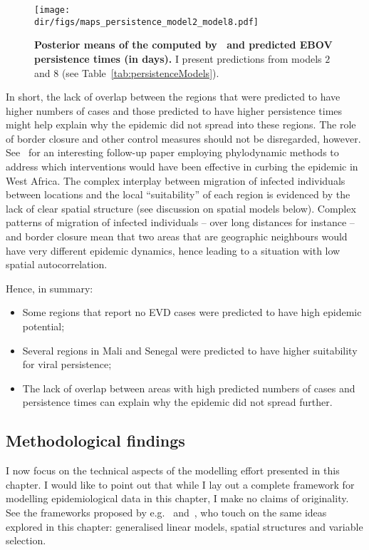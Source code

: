 \begin{figure}[htbp]
  \centering
  \texttt{[image: \\dir/figs/maps\_persistence\_model2\_model8.pdf]}
  \caption[Persistence times predictions]{\textbf{Posterior means of the computed by~\cite{Dudas2017} and predicted EBOV persistence times (in days).}
  I present predictions from models $2$ and $8$ (see Table~\ref{tab:persistenceModels}).
  }
  \label{fig:mapsPersistence}
\end{figure}


In short, the lack of overlap between the regions that were predicted to have higher numbers of cases and those predicted to have higher persistence times might help explain why the epidemic did not spread into these regions.
The role of border closure and other control measures should not be disregarded, however.
See~\cite{Dellicour2017} for an interesting follow-up paper employing phylodynamic methods to address which interventions would have been effective in curbing the epidemic in West Africa.
The complex interplay between migration of infected individuals between locations and the local ``suitability'' of each region is evidenced by the lack of clear spatial structure (see discussion on spatial models below).
Complex patterns of migration of infected individuals -- over long distances for instance -- and border closure mean that two areas that are geographic neighbours would have very different epidemic dynamics, hence leading to a situation with low spatial autocorrelation.


Hence, in summary:
\begin{itemize}
 \item Some regions that report no EVD cases were  predicted to have high epidemic potential;
 \item Several regions in Mali and Senegal were predicted to have higher suitability for viral persistence;
 \item The lack of overlap between areas with high predicted numbers of cases and persistence times can explain why the epidemic did not spread further.
\end{itemize}

\subsection*{Methodological findings}

I now focus on the technical aspects of the modelling effort presented in this chapter.
I would like to point out that while I lay out a complete framework for modelling epidemiological data in this chapter, I make no claims of originality.
See the frameworks proposed by e.g.~\cite{Scheel2013} and~\cite{Boehm2015}, who touch on the same ideas explored in this chapter: generalised linear models, spatial structures and variable selection.

